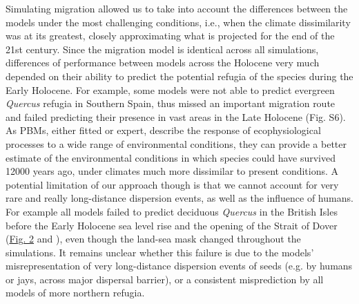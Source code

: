 \documentclass[9pt,twocolumn,twoside]{pnas-new}
\begin{document}
Simulating migration allowed us to take into account the differences between the models under the most challenging conditions, i.e., when the climate dissimilarity was at its greatest, closely approximating what is projected for  the end of the 21st century. Since the migration model is identical across all simulations, differences of performance between models across the Holocene very much depended on their ability to predict the potential refugia of the species during the Early Holocene. For example, some models were not able to predict evergreen \emph{Quercus} refugia in Southern Spain, thus missed an important migration route and failed predicting their presence in vast areas in the Late Holocene (Fig. S6). As PBMs, either fitted or expert, describe the response of ecophysiological processes to a wide range of environmental conditions, they can provide a better estimate of the environmental conditions in which species could have survived 12000 years ago, under climates much more dissimilar to present conditions. A potential limitation of our approach though is that we cannot account for very rare and really long-distance dispersion events, as well as the influence of humans. For example all models failed to predict deciduous \emph{Quercus} in the British Isles before the Early Holocene sea level rise and the opening of the Strait of Dover (\hyperref[fig:quercusdeciduoussimulations]{Fig. 2} and \cite{Smith2011}), even though the land-sea mask changed throughout the simulations. It remains unclear whether this failure is due to the models' misrepresentation of very long-distance dispersion events of seeds (e.g. by humans or jays, across major dispersal barrier), or a consistent misprediction by all models of more northern refugia.
\end{document}
